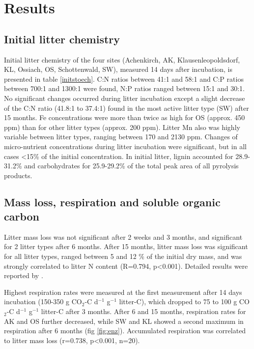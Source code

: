 \section*{Results}
\subsection*{Initial litter chemistry}
Initial litter chemistry of the four sites (Achenkirch, AK, Klausenleopoldsdorf, KL, Ossiach, OS, Schottenwald, SW), measured 14 days after incubation, is presented in table \ref{initstoech}. C:N ratios between 41:1 and 58:1 and C:P ratios between 700:1 and 1300:1 were found, N:P ratios ranged between 15:1 and 30:1. No significant changes occurred during litter incubation except a slight decrease of the C:N ratio (41.8:1 to 37.4:1) found in the most active litter type (SW) after 15 months. Fe concentrations were more than twice as high for OS (approx. 450 ppm) than for other litter types (approx. 200 ppm). Litter Mn also was highly variable between litter types, ranging between 170 and 2130 ppm. Changes of micro-nutrient concentrations during litter incubation were significant, but in all cases \textless 15\% of the initial concentration. In initial litter, lignin accounted for 28.9-31.2\% and carbohydrates for 25.9-29.2\% of the total peak area of all pyrolysis products.

\subsection*{Mass loss, respiration and soluble organic carbon}

Litter mass loss was not significant after 2 weeks and 3 months, and significant for 2 litter types after 6 months. After 15 months, litter mass loss was significant for all litter types, ranged between 5 and 12 \% of the initial dry mass, and was strongly correlated to litter N content (R=0.794, p\textless 0.001). Detailed results were reported by \cite{Mooshammer2011}.

Highest respiration rates were measured at the first measurement after 14 days incubation (150-350 \textmu g CO$_2$-C d$^{-1}$ g$^{-1}$ litter-C), which dropped to 75 to 100 \textmu g CO$_2$-C d$^{-1}$ g$^{-1}$ litter-C after 3 months. After 6 and 15 months, respiration rates for AK and OS further decreased, while SW and KL showed a second maximum in respiration after 6 months (fig \ref{fig:enz}). Accumulated respiration was correlated to litter mass loss (r=0.738, p\textless 0.001, n=20).%

